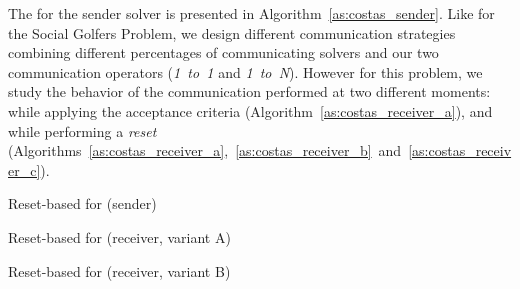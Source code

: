 The \as{} for the sender solver is presented in Algorithm~\ref{as:costas_sender}. Like for the Social Golfers Problem, we design different communication strategies combining different percentages of communicating solvers and our two communication operators ({\it 1~to~1} and {\it 1~to~N}). However for this problem, we study the behavior of the communication performed at two different moments: while applying the acceptance criteria (Algorithm~\ref{as:costas_receiver_a}), and while performing a {\it reset} (Algorithms~\ref{as:costas_receiver_a},~\ref{as:costas_receiver_b}~and~\ref{as:costas_receiver_c}).

\begin{algorithm}[H]
\dontprintsemicolon
\SetNoline
{}
\caption{Reset-based \as{} for \CARRP{} (sender)}\label{as:costas_sender}
\end{algorithm}

\begin{algorithm}[H]
\dontprintsemicolon
\SetNoline
{}
\caption{Reset-based \as{} for \CARRP{} (receiver, variant A)}\label{as:costas_receiver_a}
\end{algorithm}

\begin{algorithm}[H]
\dontprintsemicolon
\SetNoline
{}
\caption{Reset-based \as{} for \CARRP{} (receiver, variant B)}\label{as:costas_receiver_b}
\end{algorithm}

